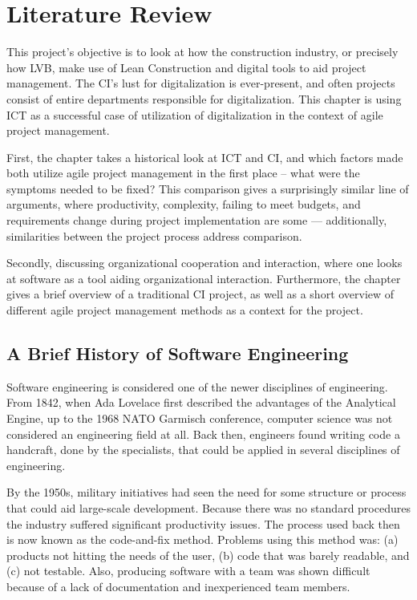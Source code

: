 
\chapter{Literature Review}
This project's objective is to look at how the construction industry, or precisely how LVB, make use of Lean Construction and digital tools to aid project management. The CI's lust for digitalization is ever-present, and often projects consist of entire departments responsible for digitalization. This chapter is using ICT as a successful case of utilization of digitalization in the context of agile project management. 

First, the chapter takes a historical look at ICT and CI, and which factors made both utilize agile project management in the first place – what were the symptoms needed to be fixed? This comparison gives a surprisingly similar line of arguments, where productivity, complexity, failing to meet budgets, and requirements change during project implementation are some — additionally, similarities between the project process address comparison. 

Secondly, discussing organizational cooperation and interaction, where one looks at software as a tool aiding organizational interaction. Furthermore, the chapter gives a brief overview of a traditional CI project, as well as a short overview of different agile project management methods as a context for the project.

\section{A Brief History of Software Engineering}
Software engineering is considered one of the newer disciplines of engineering. From 1842, when Ada Lovelace first described the advantages of the Analytical Engine, up to the 1968 NATO Garmisch conference, computer science was not considered an engineering field at all. Back then, engineers found writing code a handcraft, done by the specialists, that could be applied in several disciplines of engineering. 

By the 1950s, military initiatives had seen the need for some structure or process that could aid large-scale development. Because there was no standard procedures the industry suffered significant productivity issues. The process used back then is now known as the code-and-fix method. Problems using this method was: (a) products not hitting the needs of the user, (b) code that was barely readable, and (c) not testable. Also, producing software with a team was shown difficult because of a lack of documentation and inexperienced team members. 

